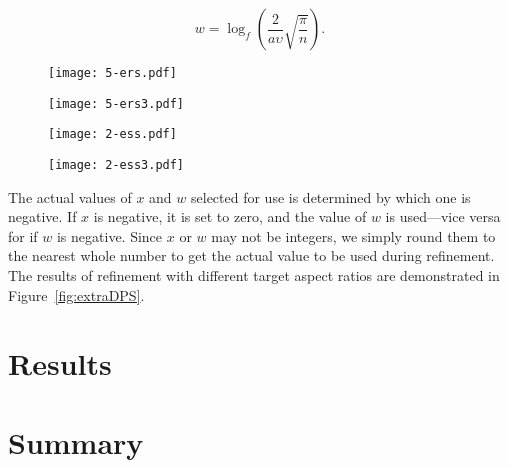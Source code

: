 \begin{equation}
w = \log_{f} \left( \frac{2}{a \upsilon} \sqrt{ \frac{\pi}{n}} \right).
\label{eq:num2D}
\end{equation}


\begin{figure*}[h]
	\centering
	\begin{subfigure}[]{0.25\textwidth}
		\centering
		\texttt{[image: 5-ers.pdf]}
		\caption{}
		\label{fig:ers1}
	\end{subfigure}%
	\begin{subfigure}[]{0.25\textwidth}
		\centering
		\texttt{[image: 5-ers3.pdf]}
		\caption{}
		\label{fig:ers3}
	\end{subfigure}%
	\begin{subfigure}[]{0.25\textwidth}
		\centering
		\texttt{[image: 2-ess.pdf]}
		\caption{}
		\label{fig:ess1}
	\end{subfigure}%
	\begin{subfigure}[]{0.25\textwidth}
		\centering
		\texttt{[image: 2-ess3.pdf]}
		\caption{}
		\label{fig:ess3}
	\end{subfigure}
	
	\caption{A demonstration of how refinement can be modified to affect the aspect ratio of cells.
		All figures show a starting pyramid cell from a grid with 200 cells in its initial discretization.
		Central layer with five extra radial splits ($a = 3$ to get $x = 5$) at \textbf{(a)} one level of refinement and \textbf{(b)} three levels.
		Central layer with two applications of the surface refinement scheme ($a = 1/8$ to get $w = 2$) at \textbf{(c)} one level of refinement and \textbf{(d)} three levels}
	\label{fig:extraDPS}
\end{figure*}


The actual values of $x$ and $w$ selected for use is determined by which one is negative.
If $x$ is negative, it is set to zero, and the value of $w$ is used---vice versa for if $w$ is negative.
Since $x$ or $w$ may not be integers, we simply round them to the nearest whole number to get the actual value to be used during refinement.
The results of refinement with different target aspect ratios are demonstrated in Figure~\ref{fig:extraDPS}.

\section{Results}
\section{Summary}